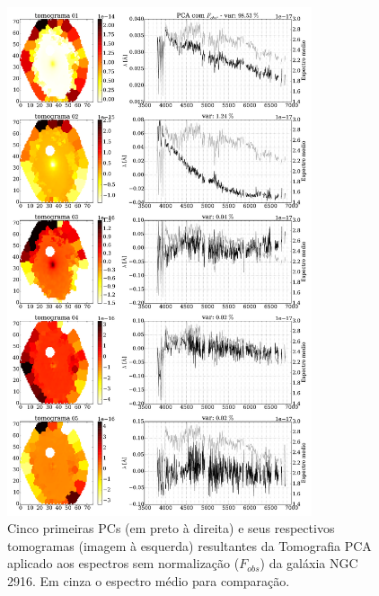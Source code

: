 \begin{figure}
    \includegraphics[width=0.8\textwidth]{figuras/K0277-tomo-obs.pdf}
    \caption[Tomogramas de 1 a 5 da gal\'axia NGC 2916 - $F_{obs}$.]
    {Cinco primeiras PCs (em preto à direita) e seus respectivos tomogramas (imagem à esquerda) resultantes da
    Tomografia PCA aplicado aos espectros sem normalização ($F_{obs}$) da galáxia NGC 2916. Em cinza o espectro médio
    para comparação.}
    \label{fig:K0277tomofobs}
\end{figure}

